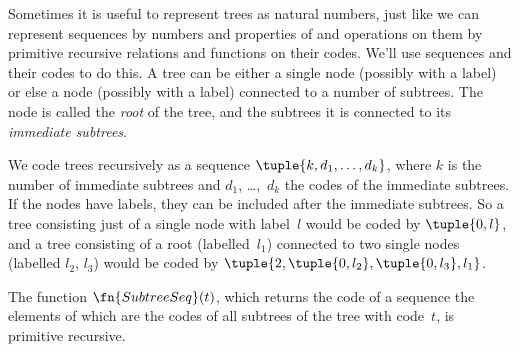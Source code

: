 \documentclass[../../../include/open-logic-section]{subfiles}
\begin{document}

Sometimes it is useful to represent trees as natural numbers, just
like we can represent sequences by numbers and properties of and
operations on them by primitive recursive relations and functions on
their codes.  We'll use sequences and their codes to do this. A tree
can be either a single node (possibly with a label) or else a node
(possibly with a label) connected to a number of subtrees. The node is
called the \emph{root} of the tree, and the subtrees it is connected
to its \emph{immediate subtrees}.

We code trees recursively as a sequence $\tuple{k, d_1, \dots, d_k}$,
where $k$ is the number of immediate subtrees and $d_1$, \dots,~$d_k$
the codes of the immediate subtrees. If the nodes have labels, they
can be included after the immediate subtrees. So a tree consisting
just of a single node with label~$l$ would be coded by $\tuple{0,l}$,
and a tree consisting of a root (labelled~$l_1$) connected to two
single nodes (labelled $l_2$, $l_3$) would be coded by $\tuple{2,
  \tuple{0, l_2}, \tuple{0, l_3}, l_1}$.

\begin{prop}
  The function $\fn{SubtreeSeq}(t)$, which returns the code of a
  sequence the elements of which are the codes of all subtrees of the
  tree with code~$t$, is primitive recursive.
\end{prop}
\end{document}
